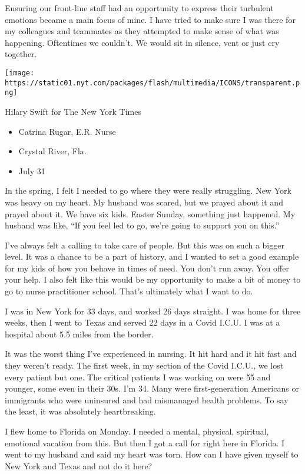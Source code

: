 Ensuring our front-line staff had an opportunity to express their
turbulent emotions became a main focus of mine. I have tried to make
sure I was there for my colleagues and teammates as they attempted to
make sense of what was happening. Oftentimes we couldn't. We would sit
in silence, vent or just cry together.

\texttt{[image: https://static01.nyt.com/packages/flash/multimedia/ICONS/transparent.png]}

Hilary Swift for The New York Times

\begin{itemize}
\tightlist
\item
  Catrina Rugar, E.R. Nurse
\item
  Crystal River, Fla.
\item
  July 31
\end{itemize}

In the spring, I felt I needed to go where they were really struggling.
New York was heavy on my heart. My husband was scared, but we prayed
about it and prayed about it. We have six kids. Easter Sunday, something
just happened. My husband was like, ``If you feel led to go, we're going
to support you on this.''

I've always felt a calling to take care of people. But this was on such
a bigger level. It was a chance to be a part of history, and I wanted to
set a good example for my kids of how you behave in times of need. You
don't run away. You offer your help. I also felt like this would be my
opportunity to make a bit of money to go to nurse practitioner school.
That's ultimately what I want to do.

I was in New York for 33 days, and worked 26 days straight. I was home
for three weeks, then I went to Texas and served 22 days in a Covid
I.C.U. I was at a hospital about 5.5 miles from the border.

It was the worst thing I've experienced in nursing. It hit hard and it
hit fast and they weren't ready. The first week, in my section of the
Covid I.C.U., we lost every patient but one. The critical patients I was
working on were 55 and younger, some even in their 30s. I'm 34. Many
were first-generation Americans or immigrants who were uninsured and had
mismanaged health problems. To say the least, it was absolutely
heartbreaking.

I flew home to Florida on Monday. I needed a mental, physical,
spiritual, emotional vacation from this. But then I got a call for right
here in Florida. I went to my husband and said my heart was torn. How
can I have given myself to New York and Texas and not do it here?

